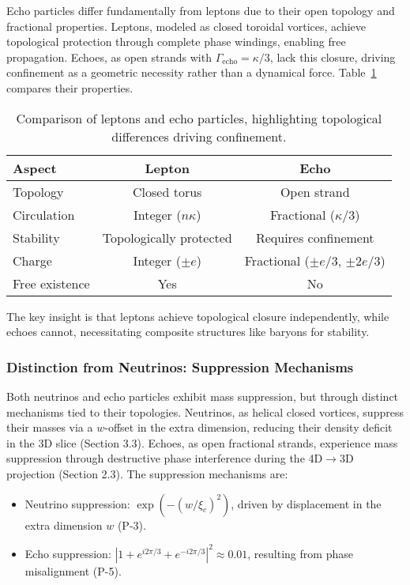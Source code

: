 Echo particles differ fundamentally from leptons due to their open topology and fractional properties. Leptons, modeled as closed toroidal vortices, achieve topological protection through complete phase windings, enabling free propagation. Echoes, as open strands with $\Gamma_{\text{echo}} = \kappa/3$, lack this closure, driving confinement as a geometric necessity rather than a dynamical force. Table~\ref{tab:echo-lepton-revised} compares their properties.

\begin{table}[h!]
\centering
\begin{tabular}{|l|c|c|}
\hline
Aspect & Lepton & Echo \\
\hline
Topology & Closed torus & Open strand \\
Circulation & Integer ($n \kappa$) & Fractional ($\kappa/3$) \\
Stability & Topologically protected & Requires confinement \\
Charge & Integer ($\pm e$) & Fractional ($\pm e/3$, $\pm 2e/3$) \\
Free existence & Yes & No \\
\hline
\end{tabular}
\caption{Comparison of leptons and echo particles, highlighting topological differences driving confinement.}
\label{tab:echo-lepton-revised}
\end{table}

The key insight is that leptons achieve topological closure independently, while echoes cannot, necessitating composite structures like baryons for stability.

\subsubsection{Distinction from Neutrinos: Suppression Mechanisms}

Both neutrinos and echo particles exhibit mass suppression, but through distinct mechanisms tied to their topologies. Neutrinos, as helical closed vortices, suppress their masses via a $w$-offset in the extra dimension, reducing their density deficit in the 3D slice (Section 3.3). Echoes, as open fractional strands, experience mass suppression through destructive phase interference during the 4D$\to$3D projection (Section 2.3). The suppression mechanisms are:

\begin{itemize}
\item Neutrino suppression: $\exp(-(w/\xi_c)^2)$, driven by displacement in the extra dimension $w$ (P-3).
\item Echo suppression: $|1 + e^{i 2\pi/3} + e^{-i 2\pi/3}|^2 \approx 0.01$, resulting from phase misalignment (P-5).
\end{itemize}

